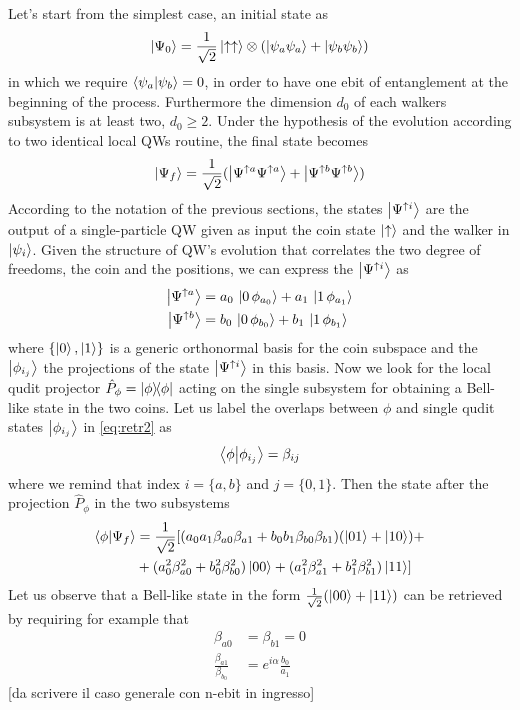 \documentclass[
	aps, pra,
	superscriptaddress, twocolumn,
	floatfix,
	10pt
]{revtex4-1}
\begin{document}
Let's start from the simplest case, an initial state as
\begin{equation}
    \ket{\Psi_0}=\frac{1}{\sqrt{2}}\ket{\uparrow\uparrow}\otimes
    ( \ket{\psi_a\psi_a}+\ket{\psi_b\psi_b})
\end{equation}
in which we require $\braket{\psi_a}{\psi_b}=0$, in order to have one ebit of entanglement at the beginning of the process. Furthermore the dimension $d_0$ of each walkers subsystem is at least two, $d_0\geq 2$. Under the hypothesis of the evolution according to two identical local QWs routine, the final state becomes
\begin{equation}
    \ket{\Psi_f}=\frac{1}{\sqrt{2}}(\ket{\Psi^{\uparrow a}\Psi^{\uparrow a}}+\ket{\Psi^{\uparrow b}\Psi^{\uparrow b}})
    \label{eq:retr1}
\end{equation}
According to the notation of the previous sections, the states $\ket{\Psi^{\uparrow i}}$ are the output of a single-particle QW given as input the coin state $\ket{\uparrow}$ and the walker in $\ket{\psi_i}$. Given the structure of QW's evolution that correlates the two degree of freedoms, the coin and the positions, we can express the $\ket{\Psi^{\uparrow i}}$ as
\begin{align}
    \ket{\Psi^{\uparrow a}}&= a_0\,\ket{0\,\phi_{a_0}} +a_1\,\ket{1\,\phi_{a_1}} \notag\\
    \ket{\Psi^{\uparrow b}}&= b_0\,\ket{0\,\phi_{b_0}} +b_1\,\ket{1\,\phi_{b_1}}
    \label{eq:retr2}
\end{align}
where $\{\ket{0},\ket{1}\}$ is a generic orthonormal basis for the coin subspace and the $\ket{\phi_{i_j}}$ the projections of the state $\ket{\Psi^{\uparrow i}}$ in this basis. 
Now we look for the local qudit projector $\hat{P}_{\phi}=\ketbra{\phi}$ acting on the single subsystem for obtaining a Bell-like state in the two coins. Let us label the overlaps between $\phi$ and single qudit states $\ket{\phi_{i_j}}$ in \eqref{eq:retr2} as
\begin{equation}
    \braket{\phi}{\phi_{i_j}}=\beta_{ij}
\end{equation}
where we remind that index $i=\{a,b\}$ and $j=\{0,1\}$. Then the state after the projection $\hat{P}_{\phi}$ in the two subsystems
\begin{equation}
\begin{split}
    \braket{\phi}{\Psi_f}&=\frac{1}{\sqrt{2}}[(a_0a_1\beta_{a0}\beta_{a1}
    + b_0b_1 \beta_{b0}\beta_{b1})(\ket{01}+\ket{10})+\\
    &+(a_0^2\beta_{a0}^2+b_0^2\beta_{b0}^2)\ket{00}+ (a_1^2\beta_{a1}^2+b_1^2\beta_{b1}^2)\ket{11}]
\end{split}
\end{equation}
Let us observe that a Bell-like state in the form $\frac{1}{\sqrt{2}}(\ket{00}+\ket{11})$ can be retrieved by requiring for example that 
\begin{align}
\beta_{a0}&=\beta_{b1}=0 \label{eq:retr_cond1}\\
\frac{\beta_{a1}}{\beta_{b_0}}&= e^{i \alpha} \frac{b_0}{a_1} \label{eq:retr_cond2}
\end{align}
[da scrivere il caso generale con n-ebit in ingresso]
\end{document}
